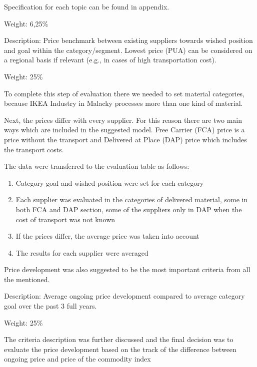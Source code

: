 \documentclass[oneside,12pt]{article}%
\begin{document}
Specification for each topic can be found in appendix. \par
Weight: 6,25\%



Description: Price benchmark between existing suppliers towards wished position and goal within the category/segment. Lowest price (PUA) can be considered on a regional basis if relevant (e.g., in cases of high transportation cost). \par
Weight: 25\% \par

To complete this step of evaluation there we needed to set material categories, because IKEA Industry in Malacky processes more than one kind of material. \par
Next, the prices differ with every supplier. For this reason there are two main ways which are included in the suggested model. Free Carrier (FCA) price is a price without the transport and Delivered at Place (DAP) price which includes the transport costs. \par
The data were transferred to the evaluation table as follows:

\begin{enumerate}
  \item Category goal and wished position were set for each category
  \item Each supplier was evaluated in the categories of delivered material, some in both FCA and DAP section, some of the suppliers only in DAP when the cost of transport was not known
  \item If the prices differ, the average price was taken into account
  \item The results for each supplier were averaged
\end{enumerate}

Price development was also suggested to be the most important criteria from all the mentioned.


Description: Average ongoing price development compared to average category goal over the past 3 full years. \par
Weight: 25\% \par
The criteria description was further discussed and the final decision was to evaluate the price development based on the track of the difference between ongoing price and price of the commodity index

\end{document}
